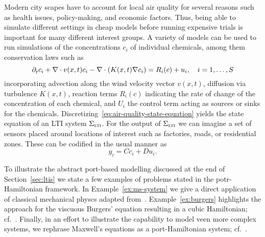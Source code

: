 \begin{example}
    Modern city scapes have to account for local air quality for several reasons such as health issues, policy-making, and economic factors.
    Thus, being able to simulate different settings in cheap models before running expensive trials is important for many different interest groups.
    A variety of models can be used to run simulations of the concentrations $c_i$ of individual chemicals, among them conservation laws such as
    \begin{equation}\label{eq:air-quality-state-equation}
        \pd[t]{} c_i + \nabla \cdot v(x, t) c_i - \nabla \cdot (K(x, t) \nabla c_i) = R_i(c) + u_i,\quad i = 1, \dots, S
    \end{equation}
    incorporating advection along the wind velocity vector $v(x, t)$, diffusion via turbulence $K(x, t)$, reaction terms $R_i(c)$ indicating the rate of change of the concentration of each chemical, and $U_i$ the control term acting as sources or sinks for the chemicals.
    Discretizing~\eqref{eq:air-quality-state-equation} yields the state equation of an LTI system $\Sigma_{\textsc{lti}}$.
    For the output of $\Sigma_{\textsc{lti}}$ we can imagine a set of sensors placed around locations of interest such as factories, roads, or residential zones.
    These can be codified in the usual manner as
    \begin{equation*}
        y_i = C c_i + D u_i.
    \end{equation*}

\end{example}

To illustrate the abstract port-based modelling discussed at the end of Section~\ref{sec:ltis} we state a few examples of problems stated in the potr-Hamiltonian framework.
In Example~\ref{ex:ms-system} we give a direct application of classical mechanical physcs adapted from~\cite[Example~2.1]{VanDerSchaft2014}.
Example~\ref{ex:burgers} highlights the approach for the viscuous Burgers' equation resulting in a cubic Hamiltonian; cf.~\cite[Example~2.1]{Maschke2005}.
Finally, in an effort to illustrate the capability to model veen more complex systems, we rephrase Maxwell's equations as a port-Hamiltonian system; cf.~\cite[Section~2]{Haine2022}.


